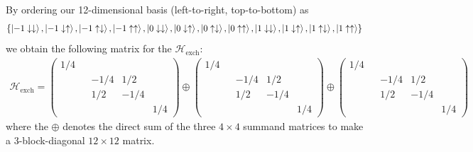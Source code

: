 \documentclass{article}
\theoremstyle{definition}
\newcommand{\ham}{\mathcal{H}}
\begin{document}
\begin{enumerate}[label=(\alph*)]
	
	By ordering our 12-dimensional basis (left-to-right, top-to-bottom) as 
	\begin{align*}
	\{\ket{-1\downarrow\downarrow},
	\ket{-1\downarrow\uparrow},
	\ket{-1\uparrow\downarrow},
	\ket{-1\uparrow\uparrow},
	\ket{0\downarrow\downarrow},
	\ket{0\downarrow\uparrow},
	\ket{0\uparrow\downarrow},
	\ket{0\uparrow\uparrow},
	\ket{1\downarrow\downarrow},
	\ket{1\downarrow\uparrow},
	\ket{1\uparrow\downarrow},
	\ket{1\uparrow\uparrow}\}
	\end{align*}
	we obtain the following matrix for the $\ham_\text{exch}$:
	\begin{align*}
	\ham_\text{exch} = \begin{pmatrix}
	1/4 & & & \\
	& &-1/4 & 1/2 &\\
	& & 1/2 & -1/4 &\\
	& & & & 1/4
	\end{pmatrix} \oplus \begin{pmatrix}
	1/4 & & & \\
	& &-1/4 & 1/2 &\\
	& & 1/2 & -1/4 &\\
	& & & & 1/4
	\end{pmatrix}
	\oplus 
	\begin{pmatrix}
	1/4 & & & \\
	& &-1/4 & 1/2 &\\
	& & 1/2 & -1/4 &\\
	& & & & 1/4
	\end{pmatrix}
	\end{align*}
	where the $\oplus$ denotes the direct sum of the three $4\times 4$ summand matrices to make a 3-block-diagonal $12\times 12$ matrix. 
	

\end{enumerate}
\end{document}
